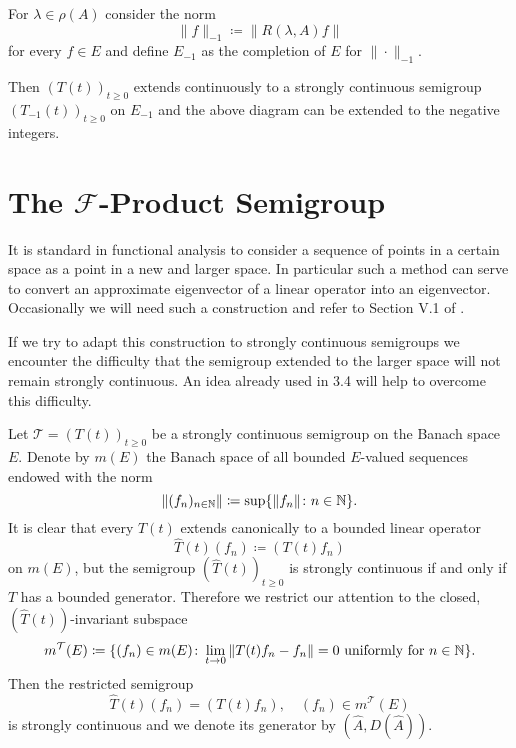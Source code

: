 \begin{remark}\label{rem:a1-19.2}
For $\lambda \in \rho(A)$ consider the norm
\[
    \|f\|_{-1} \coloneqq \|R(\lambda,A)f\|
\]
for every $f \in E$ and define $E_{-1}$ as the completion of $E$ for $\|\cdot\|_{-1}$.
\end{remark}
Then $(T(t))_{t \geq 0}$ extends continuously to a strongly continuous semigroup $(T_{-1}(t))_{t \geq 0}$ on $E_{-1}$ and the above diagram can be extended to the negative integers.
\section{The \texorpdfstring{$\mathcal{F}$}{F}-Product Semigroup}\label{sec:a1-3.6}
It is standard in functional analysis to consider a sequence of points in a certain space as a point in a new and larger space.
In particular such a method can serve to convert an approximate eigenvector of a linear operator into an eigenvector.
Occasionally we will need such a construction and refer to Section V.1 of \citet{schaefer:1974}. 

If we try to adapt this construction to strongly continuous semigroups we encounter the difficulty that the semigroup extended to the larger space will not remain strongly continuous.
An idea already used in 3.4 will help to overcome this difficulty.

Let $\mathcal{T} = (T(t))_{t \geq 0}$ be a strongly continuous semigroup on the Banach space $E$.
Denote by $m(E)$ the Banach space of all bounded $E$-valued sequences endowed with the norm
\[
    \|(f_{n})_{n \in \mathbb{N}}\| \coloneqq \sup \{\|f_{n}\| \colon n \in \mathbb{N}\} .
\]
It is clear that every $T(t)$ extends canonically to a bounded linear operator
\[
    \hat{T}(t)(f_{n}) \coloneqq (T(t)f_{n})
\]
on $m(E)$, but the semigroup $(\hat{T}(t))_{t \geq 0}$ is strongly continuous if and only if $T$ has a bounded generator.
Therefore we restrict our attention to the closed, $(\hat{T}(t))$-invariant subspace
\[
    m^{\mathcal{T}}(E) \coloneqq \{(f_{n}) \in m(E) \colon \lim_{t \to 0} \|T(t)f_{n}-f_{n}\| = 0 \text{ uniformly for } n \in \mathbb{N}\} .
\]
Then the restricted semigroup
\[
    \hat{T}(t)(f_{n}) = (T(t)f_{n}), \quad (f_{n}) \in m^{\mathcal{T}}(E)
\]
is strongly continuous and we denote its generator by $(\hat{A},D(\hat{A}))$.

